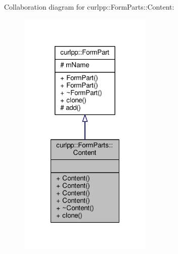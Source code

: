 Collaboration diagram for curlpp\-:\-:Form\-Parts\-:\-:Content\-:\nopagebreak
\begin{figure}[H]
\begin{center}
\leavevmode
\includegraphics[width=180pt]{classcurlpp_1_1FormParts_1_1Content__coll__graph}
\end{center}
\end{figure}
